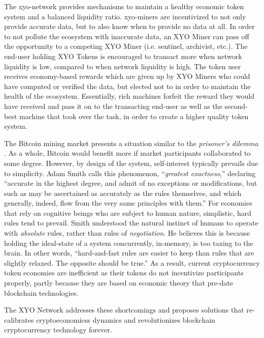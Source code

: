 \documentclass{article}
\begin{document}
The \Gls{xyo-network} provides mechanisms to maintain a healthy economic token system and a balanced liquidity ratio. \Glspl{xyo-miner} are incentivized to not only provide accurate data, but to also know when to provide no data at all. In order to not pollute the ecosystem with inaccurate data, an XYO Miner can pass off the opportunity to a competing XYO Miner (i.e. \Gls{sentinel}, \Gls{archivist}, etc.). The end-user holding XYO Tokens is encouraged to transact more when network liquidity is low, compared to when network liquidity is high. The token user receives economy-based rewards which are given up by XYO Miners who could have computed or verified the data, but elected not to in order to maintain the health of the ecosystem. Essentially, rich machines forfeit the reward they would have received and pass it on to the transacting end-user as well as the second-best machine that took over the task, in order to create a higher quality token system. 

The Bitcoin mining market presents a situation similar to the \textit{prisoner's dilemma} \cite{lave-prisonersdilemma}. As a whole, Bitcoin would benefit more if market participants collaborated to some degree. However, by design of the system, self-interest typically prevails due to simplicity. Adam Smith calls this phenomenon, ``\textit{greatest exactness},'' declaring ``accurate in the highest degree, and admit of no exceptions or modifications, but such as may be ascertained as accurately as the rules themselves, and which generally, indeed, flow from the very same principles with them.''\cite{smith-sentiments} For economies that rely on cognitive beings who are subject to human nature, simplistic, hard rules tend to prevail. Smith understood the natural instinct of humans to operate with \textit{absolute} rules, rather than rules of \textit{negotiation}. He believes this is because holding the ideal-state of a system concurrently, in-memory, is too taxing to the brain. In other words, ``hard-and-fast rules are easier to keep than rules that are slightly relaxed. The opposite should be true.''\cite{roberts-howadamsmith} As a result, current cryptocurrency token economies are inefficient as their tokens do not incentivize participants properly, partly because they are based on economic theory that pre-date blockchain technologies.

The XYO Network addresses these shortcomings and proposes solutions that re-calibrates \glspl{cryptoeconomics} dynamics and revolutionizes blockchain cryptocurrency technology forever.
\end{document}
